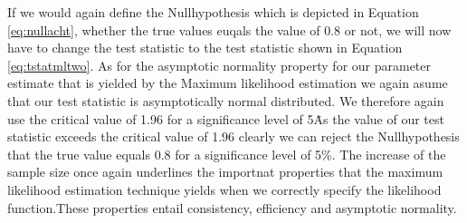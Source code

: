 \documentclass[12pt]{article}
\begin{document}
If we would again define the Nullhypothesis which is depicted in Equation  \ref{eq:nullacht}, whether the true values euqals the value of 0.8 or not, we will now have to change the test statistic to the test statistic shown in Equation \ref{eq:tstatmltwo}.
As for the asymptotic normality property for our parameter estimate that is yielded by the Maximum likelihood estimation we again asume that our test statistic is asymptotically normal distributed. We therefore again use the critical value of 1.96 for a significance level of 5\.%
As the value of our test statistic exceeds the critical value of 1.96 clearly we can reject the Nullhypothesis that the true value equals 0.8 for a significance level of 5\%.
The increase of the sample size once again underlines the importnat properties that the maximum likelihood estimation technique yields when we correctly specify the likelihood function.These properties entail consistency, efficiency and asymptotic normality.
\end{document}
